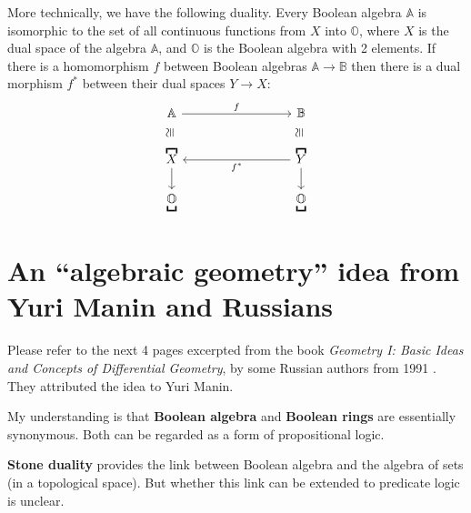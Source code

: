 More technically, we have the following duality.  Every Boolean algebra $\mathbb{A}$ is isomorphic to the set of all continuous functions from $X$ into $\mathbb{O}$, where $X$ is the dual space of the algebra $\mathbb{A}$, and $\mathbb{O}$ is the Boolean algebra with 2 elements.  If there is a homomorphism $f$ between Boolean algebras $\mathbb{A} \rightarrow \mathbb{B}$ then there is a dual morphism $f^*$ between their dual spaces $Y \rightarrow X$:
\begin{equation}
\begin{tikzcd}[column sep=3cm, row sep=0.6cm]
\mathbb{A} \arrow[r,"f"] \arrow[d,shift left=2,phantom,"\cong"{anchor=south,rotate=90}] & \mathbb{B} \arrow[d,shift left=2,phantom,"\cong"{anchor=south,rotate=90}] \\
\overbracket{X} \arrow[d] & \overbracket{Y} \arrow[d] \arrow[l,"f^*"] \\
\underbracket{\mathbb{O}} & \underbracket{\mathbb{O}} 
\end{tikzcd}
\end{equation}

\section{An ``algebraic geometry'' idea from Yuri Manin and Russians}

Please refer to the next 4 pages excerpted from the book \textit{Geometry I: Basic Ideas and Concepts of Differential Geometry}, by some Russian authors from 1991 \cite{Alekseevskij1991}.  They attributed the idea to Yuri Manin.

My understanding is that \textbf{Boolean algebra} and \textbf{Boolean rings} are essentially synonymous.  Both can be regarded as a form of propositional logic.

\textbf{Stone duality} provides the link between Boolean algebra and the algebra of sets (in a topological space).  But whether this link can be extended to predicate logic is unclear.






